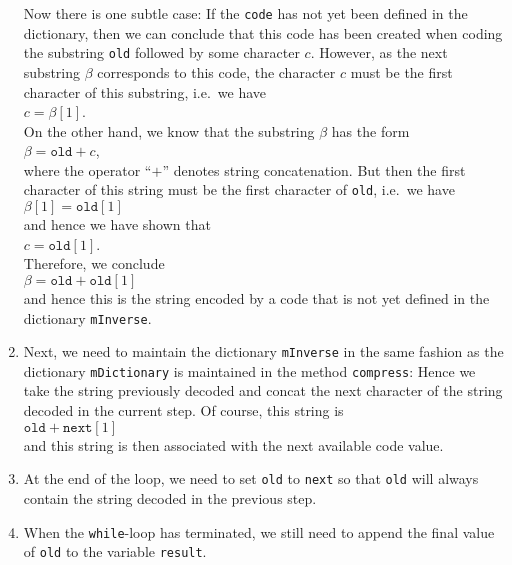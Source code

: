 \begin{enumerate}
      Now there is one subtle case: If the \texttt{code} has not yet been defined in the
      dictionary,  then we can conclude that this code has been created when coding the
      substring \texttt{old} followed by some character $c$.  However, as the next substring $\beta$
      corresponds to this code, the character $c$ must be the first
      character of this substring, i.e.~we have
      \\[0.2cm]
      \hspace*{1.3cm}
      $c = \beta[1]$.
      \\[0.2cm]
      On the other hand, we know that the substring $\beta$ has the form
      \\[0.2cm]
      \hspace*{1.3cm}
      $\beta = \texttt{old} + c$,
      \\[0.2cm]
      where the operator ``$+$'' denotes string concatenation.  But then the first character of this string
      must be the first character of \texttt{old}, i.e.~we have
      \\[0.2cm]
      \hspace*{1.3cm}
      $\beta[1] = \texttt{old}[1]$
      \\[0.2cm]
      and hence we have shown that
      \\[0.2cm]
      \hspace*{1.3cm}
      $c = \texttt{old}[1]$.
      \\[0.2cm]
      Therefore, we conclude
      \\[0.2cm]
      \hspace*{1.3cm}
      $\beta = \texttt{old} + \texttt{old}[1]$
      \\[0.2cm]
      and hence this is the string encoded by a code that is not yet defined in the dictionary
      \texttt{mInverse}.
\item Next, we need to maintain the dictionary \texttt{mInverse} in the same fashion as the
      dictionary \texttt{mDictionary} is maintained in the method \texttt{compress}:
      Hence we take the string previously decoded and concat the next character of the
      string decoded in the current step.  Of course, this string is
      \\[0.2cm]
      \hspace*{1.3cm}
      $\texttt{old} + \texttt{next}[1]$
      \\[0.2cm]
      and this string is then associated with the next available code value.
\item At the end of the loop, we need to set \texttt{old} to \texttt{next} so that \texttt{old}
      will always contain the string decoded in the previous step.
\item When the \texttt{while}-loop has terminated, we still need to append the final value of \texttt{old}
      to the variable \texttt{result}.
\end{enumerate}
